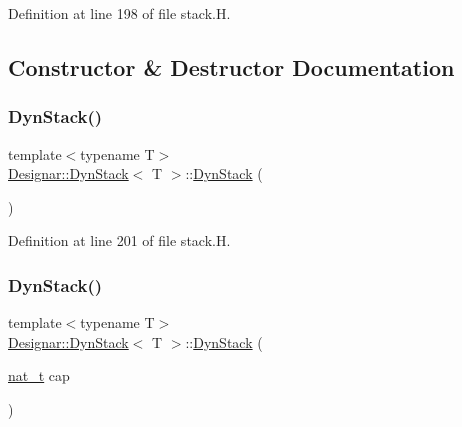 Definition at line 198 of file stack.\+H.



\subsection{Constructor \& Destructor Documentation}
\mbox{\label{class_designar_1_1_dyn_stack_a974a328c42eeb04114249c321a7d2ebe}} 
\subsubsection{\texorpdfstring{Dyn\+Stack()}{DynStack()}\hspace{0.1cm}{\footnotesize\ttfamily [1/4]}}
{\footnotesize\ttfamily template$<$typename T$>$ \\
\hyperlink{class_designar_1_1_dyn_stack}{Designar\+::\+Dyn\+Stack}$<$ T $>$\+::\hyperlink{class_designar_1_1_dyn_stack}{Dyn\+Stack} (\begin{DoxyParamCaption}{ }\end{DoxyParamCaption})\hspace{0.3cm}{\ttfamily [inline]}}



Definition at line 201 of file stack.\+H.

\mbox{\label{class_designar_1_1_dyn_stack_afe8f19b00f9c0cb21ea2d64fedadcb5e}} 
\subsubsection{\texorpdfstring{Dyn\+Stack()}{DynStack()}\hspace{0.1cm}{\footnotesize\ttfamily [2/4]}}
{\footnotesize\ttfamily template$<$typename T$>$ \\
\hyperlink{class_designar_1_1_dyn_stack}{Designar\+::\+Dyn\+Stack}$<$ T $>$\+::\hyperlink{class_designar_1_1_dyn_stack}{Dyn\+Stack} (\begin{DoxyParamCaption}\item[{\hyperlink{namespace_designar_aa72662848b9f4815e7bf31a7cf3e33d1}{nat\+\_\+t}}]{cap }\end{DoxyParamCaption})\hspace{0.3cm}{\ttfamily [inline]}}



